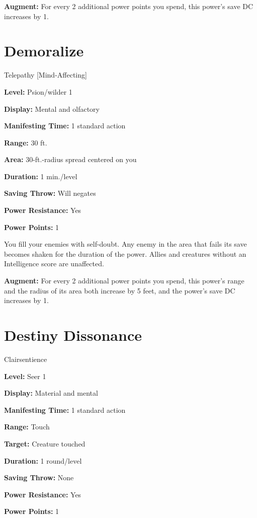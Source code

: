\documentclass{article}
\begin{document}
\textbf{Augment:} For every 2 additional power points you spend, this power's save 
DC increases by 1.

\vspace{12pt}
\section*{Demoralize}

Telepathy [Mind-Affecting]

\textbf{Level:} Psion/wilder 1

\textbf{Display:} Mental and olfactory

\textbf{Manifesting Time:} 1 standard action

\textbf{Range:} 30 ft.

\textbf{Area:} 30-ft.-radius spread centered on you

\textbf{Duration:} 1 min./level

\textbf{Saving Throw:} Will negates

\textbf{Power Resistance:} Yes

\textbf{Power Points:} 1

You fill your enemies with self-doubt. Any enemy in the area that fails its save 
becomes shaken for the duration of the power. Allies and creatures without an Intelligence 
score are unaffected.

\textbf{Augment:} For every 2 additional power points you spend, this power's range 
and the radius of its area both increase by 5 feet, and the power's save DC increases 
by 1.

\vspace{12pt}
\section*{Destiny Dissonance}

Clairsentience

\textbf{Level:} Seer 1

\textbf{Display:} Material and mental

\textbf{Manifesting Time:} 1 standard action

\textbf{Range:} Touch

\textbf{Target:} Creature touched

\textbf{Duration:} 1 round/level

\textbf{Saving Throw:} None

\textbf{Power Resistance:} Yes

\textbf{Power Points:} 1
\end{document}
